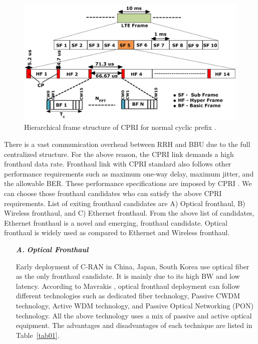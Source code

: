 \begin{multicols}{2}
\begin{figure}[H]
\centering
\includegraphics[scale=.34]{src/Figures/chap3/fig03.jpg}
\caption{Hierarchical frame structure of CPRI for normal cyclic prefix \cite{art3-key40}.}\label{fig03}
\vspace{-.5cm}
\end{figure}

There is a vast communication overhead between RRH and BBU due to the full centralized structure. For the above reason, the CPRI link demands a high fronthaul data rate. Fronthaul link with CPRI standard also follows other performance requirements such as maximum one-way delay, maximum jitter, and the allowable BER. These performance specifications are imposed by CPRI \cite{art3-key41}. We can choose those fronthaul candidates who can satisfy the above CPRI requirements. List of exiting fronthaul candidates are A) Optical fronthaul, B) Wireless fronthaul, and C) Ethernet fronthaul. From the above list of candidates, Ethernet fronthaul is a novel and emerging, fronthaul candidate. Optical fronthaul is widely used as compared to Ethernet and Wireless fronthaul.

\vspace{-.3cm}

\begin{itemize}

\item[{\textit{\textbf{ A.}}}] {\textit{\textbf{Optical Fronthaul}}}

Early deployment of C-RAN in China, Japan, South Korea use optical fiber as the only fronthaul candidate. It is mainly due to its high BW and low latency. According to Mavrakis \cite{art3-key42}, optical fronthaul deployment can follow different technologies such as dedicated fiber technology, Passive CWDM technology, Active WDM technology, and Passive Optical Networking (PON) technology. All the above technology uses a mix of passive and active optical equipment. The advantages and disadvantages of each technique are listed in Table~\ref{tab01}.
\end{itemize}
\end{multicols}

